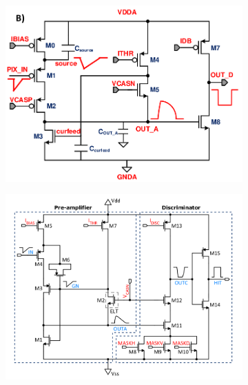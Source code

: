             \begin{figure}
                \centering
                \begin{subfigure}[b]{0.49\textwidth}
                    \centering
                    \includegraphics[width=\linewidth]{figures/Monopix1/ALPIDE_FE.png}
                    \caption{}
                    \label{fig:ALPIDE}
                \end{subfigure}
                \hfill
                \begin{subfigure}[b]{0.49\textwidth}
                    \centering
                    \includegraphics[width=\linewidth]{figures/Monopix1/Monopix1_FE_circuit.png}
                    \caption{}
                    \label{fig:Monopix}
                \end{subfigure}
                \caption{}
                \label{fig:Monopix1_FE_circuit}
                \end{figure} 
            
